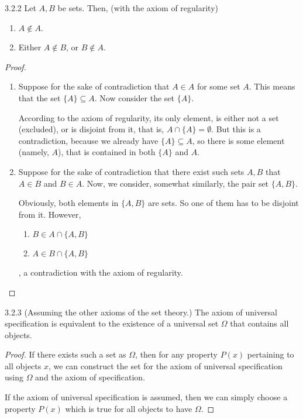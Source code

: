 \begin{exercise}{3.2.2}
	Let $A,B$ be sets. Then, (with the axiom of regularity)
	\begin{enumerate}
		\item $A \notin A$.
		\item Either $A \notin B$, or $B \notin A$.
	\end{enumerate}
\end{exercise}
\begin{proof}\leavevmode
	\begin{enumerate}
		\item Suppose for the sake of contradiction that $A \in A$ for some set $A$. This means that the set $\{A\} \subseteq A$. Now consider the set $\{A\}$.
		
		According to the axiom of regularity, its only element, is either not a set (excluded), or is disjoint from it, that is, $A \cap \{A\} = \emptyset$. But this is a contradiction, because we already have $\{A\} \subseteq A$, so there is some element (namely, $A$), that is contained in both $\{A\}$ and $A$.
		
		\item Suppose for the sake of contradiction that there exist such sets $A,B$ that $A \in B$ and $B \in A$. Now, we consider, somewhat similarly, the pair set $\{A,B\}$.
		
		Obviously, both elements in $\{A,B\}$ are sets. So one of them has to be disjoint from it. However,
		\begin{enumerate}
			\item $B \in A \cap \{A,B\}$
			\item $A \in B \cap \{A,B\}$ 	
		\end{enumerate}
		, a contradiction with the axiom of regularity.
	\end{enumerate}
\end{proof}

\begin{exercise}{3.2.3}
	(Assuming the other axioms of the set theory.) The axiom of universal specification is equivalent to the existence of a universal set $\Omega$ that contains all objects.
\end{exercise}
\begin{proof}
	\myifbox If there exists such a set as $\Omega$, then for any property $P(x)$ pertaining to all objects $x$, we can construct the set for the axiom of universal specification using $\Omega$ and the axiom of specification.
	
	\myoifbox If the axiom of universal specification is assumed, then we can simply choose a property $P(x)$ which is true for all objects to have $\Omega$.
\end{proof}

